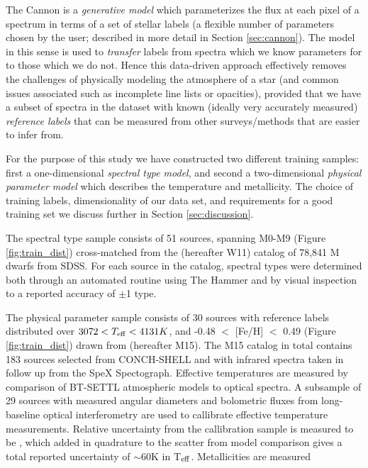\documentclass[modern]{aastex62}
\begin{document}
The Cannon is a \emph{generative model} which parameterizes the flux at each pixel of a spectrum in terms of a set of stellar labels (a flexible number of parameters chosen by the user; described in more detail in Section \ref{sec:cannon}). The model in this sense is used to \emph{transfer} labels from spectra which we know parameters for to those which we do not. Hence this data-driven approach effectively removes the challenges of physically modeling the atmosphere of a star (and common issues associated such as incomplete line lists or opacities), provided that we have a subset of spectra in the dataset with known (ideally very accurately measured) \emph{reference labels} that can be measured from other surveys/methods that are easier to infer from. 

For the purpose of this study we have constructed two different training samples: first a one-dimensional \emph{spectral type model}, and second a two-dimensional \emph{physical parameter model} which describes the temperature and metallicity. The choice of training labels, dimensionality of our data set, and requirements for a good training set we discuss further in Section \ref{sec:discussion}.

The spectral type sample consists of 51 sources, spanning M0-M9 (Figure \ref{fig:train_dist}) cross-matched from the \citealt{West:2011} (hereafter W11) catalog of 78,841 M dwarfs from SDSS. For each source in the catalog, spectral types were determined both through an automated routine using The Hammer \citep{Covey:2007} and by visual inspection to a reported accuracy of $\pm$1 type.

The physical parameter sample consists of 30 sources with reference labels distributed over $3072 < T_{\rm eff} < 4131K$, and -0.48 $<$ [Fe/H] $<$ 0.49 (Figure \ref{fig:train_dist}) drawn from \citealt{Mann:2015} (hereafter M15). The M15 catalog in total contains 183 sources selected from CONCH-SHELL \citep{Gaidos:2013} and with infrared spectra taken in follow up from the SpeX Spectograph. Effective temperatures are measured by comparison of BT-SETTL atmospheric models \citep{Allard:2011} to optical spectra. A subsample of 29 sources with measured angular diameters and bolometric fluxes from long-baseline optical interferometry are used to callibrate effective temperature measurements. Relative uncertainty from the callibration sample is measured to be \color{red}{$\sim$30K (check this)}\color{black}, which added in quadrature to the scatter from model comparison gives a total reported uncertainty of $\sim$60K in T$_{\rm eff}$. Metallicities are measured 
\end{document}
